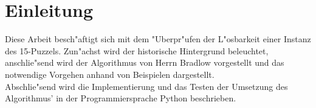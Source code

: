 \chapter{Einleitung}
Diese Arbeit besch"aftigt sich mit dem "Uberpr"ufen der L"osbarkeit einer Instanz des 15-Puzzels. Zun"achst wird der historische Hintergrund beleuchtet, anschlie"send wird der Algorithmus von Herrn Bradlow vorgestellt und das notwendige Vorgehen anhand von Beispielen dargestellt.\\
Abschlie"send wird die Implementierung und das Testen der Umsetzung des Algorithmus' in der Programmiersprache Python beschrieben.



